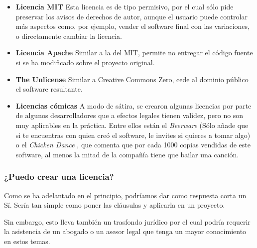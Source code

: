 \begin{itemize}
	\item \textbf{Licencia MIT} \cite{mit} Esta licencia es de tipo permisivo, por el cual sólo pide preservar los avisos de derechos de autor, aunque el usuario puede controlar más aspectos como, por ejemplo, vender el software final con las variaciones, o directamente cambiar la licencia. 
	\item \textbf{Licencia Apache} \cite{apache-license} Similar a la del MIT, permite no entregar el código fuente si se ha modificado sobre el proyecto original.
	\item \textbf{The Unlicense} \cite{unlicense} Similar a Creative Commons Zero, cede al dominio público el software resultante.
	\item \textbf{Licencias cómicas} A modo de sátira, se crearon algunas licencias por parte de algunos desarrolladores que a efectos legales tienen validez, pero no son muy aplicables en la práctica.
	 Entre ellos están el \textit{Beerware} \cite{beerware} (Sólo añade que si te encuentras con quien creó el software, le invites si quieres a tomar algo) o el \textit{Chicken Dance} \cite{chicken-dance}, que comenta que por cada 1000 copias vendidas de este software, al menos la mitad de la compañía tiene que bailar una canción.
\end{itemize}

\subsubsection{¿Puedo crear una licencia?}
Como se ha adelantado en el principio, podríamos dar como respuesta corta un Sí. Sería tan simple como poner las cláusulas y aplicarla en un proyecto. 

Sin embargo, esto lleva también un trasfondo jurídico por el cual podría requerir la asistencia de un abogado o un asesor legal que tenga un mayor conocimiento en estos temas.